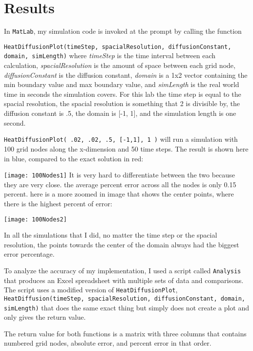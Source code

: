 \documentclass[12pt]{article}
\begin{document}
\section{Results}\label{sec::results}
In \texttt{MatLab}, my simulation code is invoked at the prompt by calling the function 

\texttt{HeatDiffusionPlot(timeStep, spacialResolution, diffusionConstant, domain, simLength)}
where \emph{timeStep} is the time interval between each calculation, \emph{spacialResolution} is the amount of space between each grid node, \emph{diffusionConstant} is the diffusion constant, \emph{domain} is a 1x2 vector containing the min boundary value and max boundary value, and \emph{simLength} is the real world time in seconds the simulation covers. For this lab the time step is equal to the spacial resolution, the spacial resolution is something that 2 is divisible by, the diffusion constant is .5, the domain is [-1, 1], and the simulation length is one second.

\texttt{HeatDiffusionPlot( .02, .02, .5, [-1,1], 1 )}
will run a simulation with 100 grid nodes along the x-dimension and 50 time steps. The result is shown here in blue, compared to the exact solution in red:

\texttt{[image: 100Nodes1]}
It is very hard to differentiate between the two because they are very close. the average percent error across all the nodes is only 0.15 percent. here is a more zoomed in image that shows the center points, where there is the highest percent of error:

\texttt{[image: 100Nodes2]}

In all the simulations that I did, no matter the time step or the spacial resolution, the points towards the center of the domain always had the biggest error percentage.

To analyze the accuracy of my implementation, I used a script called \texttt{Analysis} that produces an Excel spreadsheet with multiple sets of data and comparisons. The script uses a modified version of \texttt{HeatDiffusionPlot}, \texttt{HeatDiffusion(timeStep, spacialResolution, diffusionConstant, domain, simLength)} that does the same exact thing but simply does not create a plot and only gives the return value.

The return value for both functions is a matrix with three columns that contains numbered grid nodes, absolute error, and percent error in that order.
\end{document}
